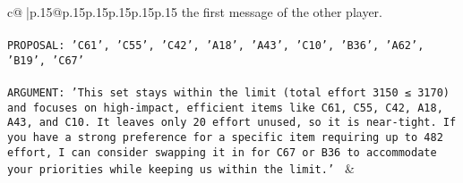 \documentclass{article}
\begin{document}
{\begin{supertabular}{c@{$\;$}|p{.15\linewidth}@{}p{.15\linewidth}p{.15\linewidth}p{.15\linewidth}p{.15\linewidth}p{.15\linewidth}}
{{{the first message of the other player.\\ \tt \\ \tt PROPOSAL: {'C61', 'C55', 'C42', 'A18', 'A43', 'C10', 'B36', 'A62', 'B19', 'C67'}\\ \tt \\ \tt ARGUMENT: {'This set stays within the limit (total effort 3150 ≤ 3170) and focuses on high-impact, efficient items like C61, C55, C42, A18, A43, and C10. It leaves only 20 effort unused, so it is near-tight. If you have a strong preference for a specific item requiring up to 482 effort, I can consider swapping it in for C67 or B36 to accommodate your priorities while keeping us within the limit.'} 
	  } 
	   } 
	   } 
	 & \\ 
 

    \theutterance {}  


\end{supertabular}}
\end{document}
